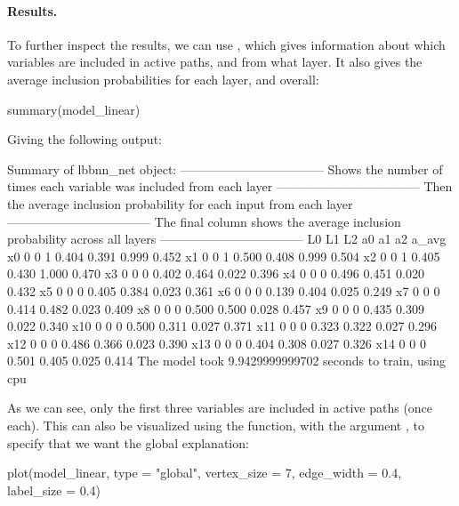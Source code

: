 \paragraph{Results.} To further inspect the results, we can use , which gives information about which variables are included in active paths, and from what layer. It also gives the average inclusion probabilities for each layer, and overall:
\begin{example}
summary(model_linear)
\end{example}
Giving the following output:
\begin{example}
Summary of lbbnn_net object:
-----------------------------------
Shows the number of times each variable was included from each layer
-----------------------------------
Then the average inclusion probability for each input from each layer
-----------------------------------
The final column shows the average inclusion probability across all layers
-----------------------------------
    L0 L1 L2    a0    a1    a2 a_avg
x0   0  0  1 0.404 0.391 0.999 0.452
x1   0  0  1 0.500 0.408 0.999 0.504
x2   0  0  1 0.405 0.430 1.000 0.470
x3   0  0  0 0.402 0.464 0.022 0.396
x4   0  0  0 0.496 0.451 0.020 0.432
x5   0  0  0 0.405 0.384 0.023 0.361
x6   0  0  0 0.139 0.404 0.025 0.249
x7   0  0  0 0.414 0.482 0.023 0.409
x8   0  0  0 0.500 0.500 0.028 0.457
x9   0  0  0 0.435 0.309 0.022 0.340
x10  0  0  0 0.500 0.311 0.027 0.371
x11  0  0  0 0.323 0.322 0.027 0.296
x12  0  0  0 0.486 0.366 0.023 0.390
x13  0  0  0 0.404 0.308 0.027 0.326
x14  0  0  0 0.501 0.405 0.025 0.414
The model took 9.9429999999702 seconds to train, using cpu
\end{example}
As we can see, only the first three variables are included in active paths (once each). This can also be visualized using the  function, with the argument , to specify that we want the global explanation: 
\begin{example}
plot(model_linear, type = "global", vertex_size = 7,
     edge_width = 0.4, label_size = 0.4)
\end{example}


